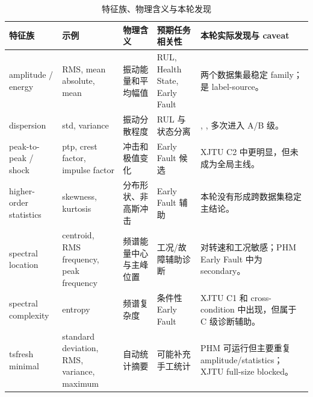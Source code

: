 \begin{table}[htbp]
\centering
\caption{特征族、物理含义与本轮发现}
\label{tab:feature_family_interpretation}
\scriptsize
\begin{tabularx}{\textwidth}{lYYYY}
\toprule
特征族 & 示例 & 物理含义 & 预期任务相关性 & 本轮实际发现与 caveat \\
\midrule
amplitude / energy & RMS, mean absolute, mean & 振动能量和平均幅值 & RUL, Health State, Early Fault & 两个数据集最稳定 family； 是 label-source。\\
dispersion & std, variance & 振动分散程度 & RUL 与状态分离 & , ,  多次进入 A/B 级。\\
peak-to-peak / shock & ptp, crest factor, impulse factor & 冲击和极值变化 & Early Fault 候选 & XJTU C2 中更明显，但未成为全局主线。\\
higher-order statistics & skewness, kurtosis & 分布形状、非高斯冲击 & Early Fault 辅助 & 本轮没有形成跨数据集稳定主结论。\\
spectral location & centroid, RMS frequency, peak frequency & 频谱能量中心与主峰位置 & 工况/故障辅助诊断 & 对转速和工况敏感；PHM Early Fault 中为 secondary。\\
spectral complexity & entropy & 频谱复杂度 & 条件性 Early Fault & XJTU C1 和 cross-condition 中出现，但属于 C 级诊断辅助。\\
tsfresh minimal & standard deviation, RMS, variance, maximum & 自动统计摘要 & 可能补充手工统计 & PHM 可运行但主要重复 amplitude/statistics；XJTU full-size blocked。\\
\bottomrule
\end{tabularx}
\end{table}
